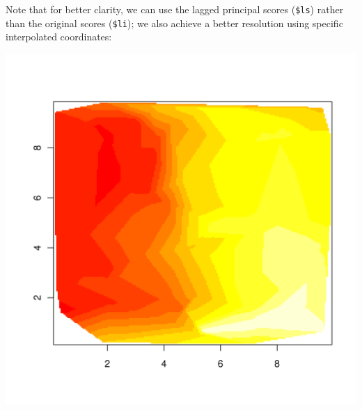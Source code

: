 \documentclass{article}
\begin{document}
\noindent Note that for better clarity, we can use the lagged principal scores (\texttt{\$ls})
rather than the original scores (\texttt{\$li}); we also achieve a better resolution using specific
interpolated coordinates:
\begin{Schunk}
\end{Schunk}
\includegraphics{figs/spca-022}
\end{document}
